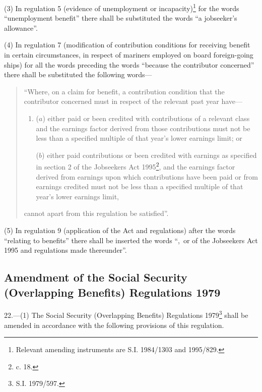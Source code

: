 \documentclass[a4paper]{article}
\begin{document}
(3) In regulation 5 (evidence of unemployment or incapacity)\footnote{\frenchspacing Relevant amending instruments are S.I. 1984/1303 and 1995/829.} for the words “unemployment benefit” there shall be substituted the words “a jobseeker’s allowance”.

(4) In regulation 7 (modification of contribution conditions for receiving benefit in certain circumstances, in respect of mariners employed on board foreign-going ships) for all the words preceding the words “because the contributor concerned” there shall be substituted the following words—
\begin{quotation}
“Where, on a claim for benefit, a contribution condition that the contributor concerned must in respect of the relevant past year have—
\begin{enumerate}\item[]
($a$) either paid or been credited with contributions of a relevant class and the earnings factor derived from those contributions must not be less than a specified multiple of that year’s lower earnings limit; or

($b$) either paid contributions or been credited with earnings as specified in section 2 of the Jobseekers Act 1995\footnote{ c. 18.}, and the earnings factor derived from earnings upon which contributions have been paid or from earnings credited must not be less than a specified multiple of that year’s lower earnings limit,
\end{enumerate}
cannot apart from this regulation be satisfied”.
\end{quotation}

(5) In regulation 9 (application of the Act and regulations) after the words “relating to benefits” there shall be inserted the words “,~or of the Jobseekers Act 1995 and regulations made thereunder”.

\subsection[22. Amendment of the Social Security (Overlapping Benefits) Regulations 1979]{Amendment of the Social Security (Overlapping Benefits) Regulations 1979}

22.—(1) The Social Security (Overlapping Benefits) Regulations 1979\footnote{\frenchspacing S.I. 1979/597.} shall be amended in accordance with the following provisions of this regulation.
\end{document}

